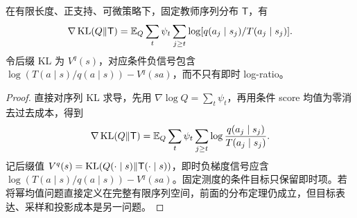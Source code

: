 \begin{proposition}[序列 KL 梯度中的后缀成本]
在有限长度、正支持、可微策略下，固定教师序列分布 $\mathsf T$，有
\begin{equation}
\nabla\operatorname{KL}(Q\Vert\mathsf T)=
\mathbb E_Q\sum_t\psi_t\sum_{j\ge t}\log[q(a_j\mid s_j)/T(a_j\mid s_j)].
\end{equation}
令后缀 KL 为 $V^q(s)$，对应条件负信号包含 $\log(T(a\mid s)/q(a\mid s))-V^q(sa)$，而不只有即时 log-ratio。
\end{proposition}
\begin{proof}
直接对序列 KL 求导，先用 $\nabla\log Q=\sum_t\psi_t$，再用条件 score 均值为零消去过去成本，得到
\begin{equation}
\nabla\operatorname{KL}(Q\Vert\mathsf T)
=\mathbb E_Q\sum_t\psi_t\sum_{j\ge t}\log\frac{q(a_j\mid s_j)}{T(a_j\mid s_j)}.
\end{equation}
记后缀值 $V^q(s)=\operatorname{KL}(Q(\cdot\mid s)\Vert\mathsf T(\cdot\mid s))$，即时负梯度信号应含 $\log(T(a\mid s)/q(a\mid s))-V^q(sa)$。固定测度的条件目标只保留即时项。若将幂均值问题直接定义在完整有限序列空间，前面的分布定理仍成立，但目标表达、采样和投影成本是另一问题。
\end{proof}



